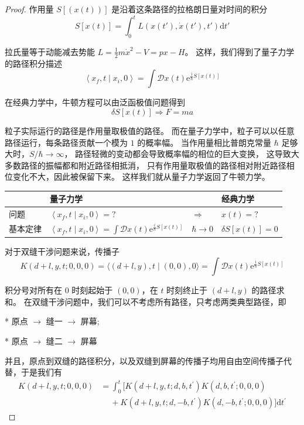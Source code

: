 \begin{proof}
作用量 $S[(x(t))]$ 是沿着这条路径的拉格朗日量对时间的积分
$$S[x(t)]=\int_{0}^{t} L(x(t'), \dot{x}(t'), t') \mathrm{d} t'$$

拉氏量等于动能减去势能 $L=\frac{1}{2} m \dot{x}^{2}-V=p x-H$。
这样，我们得到了量子力学的路径积分描述
$$\left\langle x_{f}, t \mid x_{i}, 0\right\rangle
=\int \mathcal{D} x(t) \mathrm{e}^{\frac{\mathrm{i}}{\hbar} S[x(t)]}$$

在经典力学中，牛顿方程可以由泛函极值问题得到
$$\delta S[x(t)] \Rightarrow F=m a$$

粒子实际运行的路径是作用量取极值的路径。
而在量子力学中，粒子可以以任意路径运行，每条路径贡献一个模为 $1$ 的概率幅。
当作用量相比普朗克常量 $\hbar$ 足够大时，$S / \hbar \rightarrow \infty$，
路径轻微的变动都会导致概率幅的相位的巨大变换，
这导致大多数路径的振幅都和附近路径相抵消，
只有作用量取极值的路径相对附近路径相位变化不大，因此被保留下来。
这样我们就从量子力学返回了牛顿力学。
\begin{center}\begin{tabular}{|l|l|l|l|}
\hline & \textbf{量子力学} & & \textbf{经典力学} \\
\hline 问题 & $\left\langle x_{f}, t \mid x_{i}, 0\right\rangle=?$ & $\Rightarrow$ & $x(t)=?$ \\
\hline 基本定律 & $\left\langle x_{f}, t \mid x_{i}, 0\right\rangle=\int \mathcal{D} x(t) \mathrm{e}^{\frac{i}{\hbar} S[x(t)]}$ & $\hbar \rightarrow 0$ & $\delta S[x(t)]=0$
\end{tabular}\end{center}

对于双缝干涉问题来说，传播子
$$K(d+l, y, t ; 0,0,0)=\langle(d+l, y), t \mid(0,0), 0\rangle
=\int \mathcal{D} x(t) \mathrm{e}^{\frac{\mathrm{i}}{\hbar} S[x(t)]}$$

积分号对所有在 $0$ 时刻起始于 $(0,0)$，在 $t$ 时刻终止于 $(d+l, y)$ 的路径求和。
在双缝干涉问题中，我们可以不考虑所有路径，只考虑两类典型路径，即

* 原点 $\rightarrow$ 缝一 $\rightarrow$ 屏幕;

* 原点 $\rightarrow$ 缝二 $\rightarrow$ 屏幕

并且，原点到双缝的路径积分，以及双缝到屏幕的传播子均用自由空间传播子代替，于是我们有
$$
\begin{aligned}
K(d+l, y, t ; 0,0,0)&= \int_{0}^{t}\big[K(d+l, y, t ; d, b, t^{\prime}) K(d, b, t^{\prime} ; 0,0,0) \\
& \quad\ +K(d+l, y, t ; d,-b, t^{\prime}) K(d,-b, t^{\prime} ; 0,0,0)\big] \mathrm{d} t^{\prime}
\end{aligned}
$$


\end{proof}
